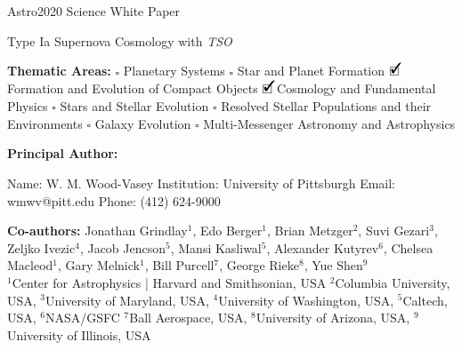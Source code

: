 \documentclass[12pt,preprint]{aastex}
\newcommand{\cmark}{\ding{51}}%
\newcommand{\done}{\rlap{$\square$}{\raisebox{2pt}{\large\hspace{1pt}\cmark}}%
\hspace{-2.5pt}}
\begin{document}
\raggedright
\thispagestyle{empty}
\huge
Astro2020 Science White Paper \linebreak

Type Ia Supernova Cosmology with {\it TSO}
\linebreak
\normalsize

\noindent \textbf{Thematic Areas:} \hspace*{60pt} $\square$ Planetary Systems \hspace*{10pt} $\square$ Star and Planet Formation \hspace*{20pt}\linebreak
$\done$ Formation and Evolution of Compact Objects \hspace*{31pt} $\done$ Cosmology and Fundamental Physics \linebreak
  $\square$  Stars and Stellar Evolution \hspace*{1pt}    $\square$ Resolved Stellar Populations and their Environments \hspace*{40pt} \linebreak
  $\square$    Galaxy Evolution   \hspace*{45pt}    $\square$ Multi-Messenger Astronomy and Astrophysics \hspace*{65pt} \linebreak

\textbf{Principal Author:}

Name: W. M. Wood-Vasey
 \linebreak
Institution: University of Pittsburgh
 \linebreak
Email: wmwv@pitt.edu
 \linebreak
Phone: (412) 624-9000
 \linebreak

\textbf{Co-authors:} Jonathan Grindlay$^1$, Edo Berger$^1$, Brian Metzger$^2$, Suvi Gezari$^3$, Zeljko Ivezic$^4$, Jacob Jencson$^5$, Mansi Kasliwal$^5$, Alexander Kutyrev$^6$, Chelsea Macleod$^1$, Gary Melnick$^1$, Bill Purcell$^7$, George Rieke$^8$, Yue Shen$^9$ \\
$^1$Center for Astrophysics | Harvard and Smithsonian, USA $^2$Columbia University, USA, $^3$University of Maryland, USA, $^4$University of Washington, USA, $^5$Caltech, USA, $^6$NASA/GSFC $^7$Ball Aerospace, USA, $^8$University of Arizona, USA, $^9$University of Illinois, USA
\linebreak
\end{document}
